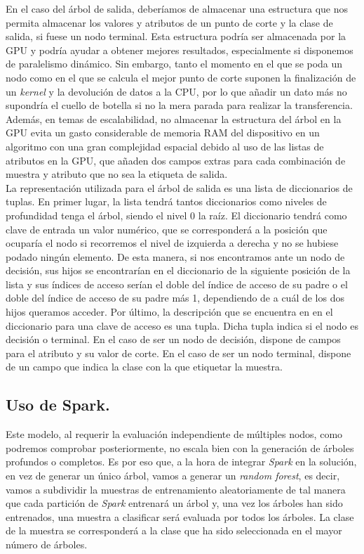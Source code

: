 En el caso del árbol de salida, deberíamos de almacenar una estructura que nos permita almacenar los valores y atributos de un punto de corte y la clase de salida, si fuese un nodo terminal. Esta estructura podría ser almacenada por la GPU y podría ayudar a obtener mejores resultados, especialmente si disponemos de paralelismo dinámico. Sin embargo, tanto el momento en el que se poda un nodo como en el que se calcula el mejor punto de corte suponen la finalización de un \textit{kernel} y la devolución de datos a la CPU, por lo que añadir un dato más no supondría el cuello de botella si no la mera parada para realizar la transferencia. Además, en temas de escalabilidad, no almacenar la estructura del árbol en la GPU evita un gasto considerable de memoria RAM del dispositivo en un algoritmo con una gran complejidad espacial debido al uso de las listas de atributos en la GPU, que añaden dos campos extras para cada combinación de muestra y atributo que no sea la etiqueta de salida.\\

La representación utilizada para el árbol de salida es una lista de diccionarios de tuplas. En primer lugar, la lista tendrá tantos diccionarios como niveles de profundidad tenga el árbol, siendo el nivel 0 la raíz. El diccionario tendrá como clave de entrada un valor numérico, que se corresponderá a la posición que ocuparía el nodo si recorremos el nivel de izquierda a derecha y no se hubiese podado ningún elemento. De esta manera, si nos encontramos ante un nodo de decisión, sus hijos se encontrarían en el diccionario de la siguiente posición de la lista y sus índices de acceso serían el doble del índice de acceso de su padre o el doble del índice de acceso de su padre más 1, dependiendo de a cuál de los dos hijos queramos acceder. Por último, la descripción que se encuentra en en el diccionario para una clave de acceso es una tupla. Dicha tupla indica si el nodo es decisión o terminal. En el caso de ser un nodo de decisión, dispone de campos para el atributo y su valor de corte. En el caso de ser un nodo terminal, dispone de un campo que indica la clase con la que etiquetar la muestra. 

\subsection{Uso de Spark.}
Este modelo, al requerir la evaluación independiente de múltiples nodos, como podremos comprobar posteriormente, no escala bien con la generación de árboles profundos o completos. Es por eso que, a la hora de integrar \textit{Spark} en la solución, en vez de generar un único árbol, vamos a generar un \textit{random forest}, es decir, vamos a subdividir la muestras de entrenamiento aleatoriamente de tal manera que cada partición de \textit{Spark} entrenará un árbol y, una vez los árboles han sido entrenados, una muestra a clasificar será evaluada por todos los árboles. La clase de la muestra se corresponderá a la clase que ha sido seleccionada en el mayor número de árboles. \\

